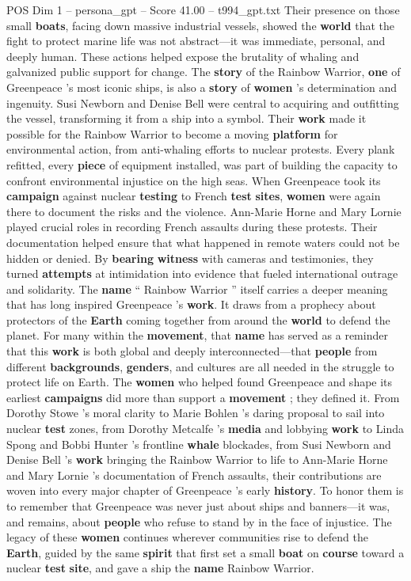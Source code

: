 \begin{textsample}{POS Dim 1 – persona\_gpt – Score 41.00 – t994\_gpt.txt}
Their presence on those small \textbf{boats}, facing down massive industrial vessels, showed the \textbf{world} that the fight to protect marine life was not abstract—it was immediate, personal, and deeply human.
These actions helped expose the brutality of whaling and galvanized public support for change.
The \textbf{story} of the Rainbow Warrior, \textbf{one} of Greenpeace ’s most iconic ships, is also a \textbf{story} of \textbf{women} ’s determination and ingenuity.
Susi Newborn and Denise Bell were central to acquiring and outfitting the vessel, transforming it from a ship into a symbol.
Their \textbf{work} made it possible for the Rainbow Warrior to become a moving \textbf{platform} for environmental action, from anti-whaling efforts to nuclear protests.
Every plank refitted, every \textbf{piece} of equipment installed, was part of building the capacity to confront environmental injustice on the high seas.
When Greenpeace took its \textbf{campaign} against nuclear \textbf{testing} to French \textbf{test} \textbf{sites}, \textbf{women} were again there to document the risks and the violence.
Ann-Marie Horne and Mary Lornie played crucial roles in recording French assaults during these protests.
Their documentation helped ensure that what happened in remote waters could not be hidden or denied.
By \textbf{bearing} \textbf{witness} with cameras and testimonies, they turned \textbf{attempts} at intimidation into evidence that fueled international outrage and solidarity.
The \textbf{name} “ Rainbow Warrior ” itself carries a deeper meaning that has long inspired Greenpeace ’s \textbf{work}.
It draws from a prophecy about protectors of the \textbf{Earth} coming together from around the \textbf{world} to defend the planet.
For many within the \textbf{movement}, that \textbf{name} has served as a reminder that this \textbf{work} is both global and deeply interconnected—that \textbf{people} from different \textbf{backgrounds}, \textbf{genders}, and cultures are all needed in the struggle to protect life on Earth.
The \textbf{women} who helped found Greenpeace and shape its earliest \textbf{campaigns} did more than support a \textbf{movement} ; they defined it.
From Dorothy Stowe ’s moral clarity to Marie Bohlen ’s daring proposal to sail into nuclear \textbf{test} zones, from Dorothy Metcalfe ’s \textbf{media} and lobbying \textbf{work} to Linda Spong and Bobbi Hunter ’s frontline \textbf{whale} blockades, from Susi Newborn and Denise Bell ’s \textbf{work} bringing the Rainbow Warrior to life to Ann-Marie Horne and Mary Lornie ’s documentation of French assaults, their contributions are woven into every major chapter of Greenpeace ’s early \textbf{history}.
To honor them is to remember that Greenpeace was never just about ships and banners—it was, and remains, about \textbf{people} who refuse to stand by in the face of injustice.
The legacy of these \textbf{women} continues wherever communities rise to defend the \textbf{Earth}, guided by the same \textbf{spirit} that first set a small \textbf{boat} on \textbf{course} toward a nuclear \textbf{test} \textbf{site}, and gave a ship the \textbf{name} Rainbow Warrior.


\end{textsample}

